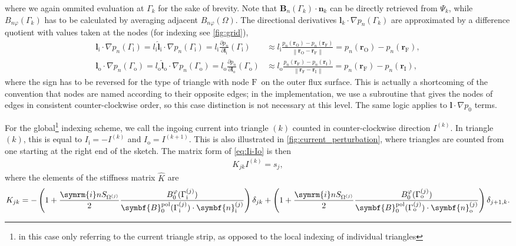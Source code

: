 \documentclass[a4paper, twoside, 10pt, english]{article}
\numberwithin{equation}{section}
\let\temp\varrho
\let\varrho\rho
\let\rho\temp
\let\temp\vartheta
\let\vartheta\theta
\let\theta\temp
\let\temp\varphi
\let\varphi\phi
\let\phi\temp
\let\vec\symbf
\newcommand*\grad{\ensuremath{\nabla}}
\newcommand*\im{\ensuremath{\symrm{i}}}  %
\newcommand*\pd[2][]{\ensuremath{\frac{\partial #1}{\partial #2}}}  %
\newcommand*\norm[1]{\ensuremath{\left \lVert #1 \right \rVert}}  %
\newcommand*\pol{\ensuremath{\textrm{pol}}}  %
\newcommand*\inw{\ensuremath{\textrm{i}}}  %
\newcommand*\out{\ensuremath{\textrm{o}}}  %
\newcommand*\vfs{\ensuremath{\textrm{F}}}  %
\newcommand*\vinw{\ensuremath{\textrm{I}}}  %
\newcommand*\vout{\ensuremath{\textrm{O}}}  %
\begin{document}
where we again ommited evaluation at $\Gamma_{k}$ for the sake of brevity. Note that $\vec{B}_{n} (\Gamma_{k}) \cdot \vec{n}_{k}$ can be directly retrieved from $\Psi_{k}$, while $B_{n \phi} (\Gamma_{k})$ has to be calculated by averaging adjacent $B_{n \phi} (\Omega)$. The directional derivatives $\vec{l}_{k} \cdot \grad p_{n} (\Gamma_{k})$ are approximated by a difference quotient with values taken at the nodes (for indexing see \cref{fig:grid}),
\begin{align}
  \vec{l}_{\inw} \cdot \grad p_{n} (\Gamma_{\inw}) = l_{\inw} \hat{\vec{l}}_{\inw} \cdot \grad p_{n} (\Gamma_{\inw}) = l_{\inw} \pd[p_{n}]{\vec{l}_{\inw}} (\Gamma_{\inw}) & \approx l_{\inw} \frac{p_{n} (\vec{r}_{\vout}) - p_{n} (\vec{r}_{\vfs})}{\norm{\vec{r}_{\vout} - \vec{r}_{\vfs}}} = p_{n} (\vec{r}_{\vout}) - p_{n} (\vec{r}_{\vfs}), \\
  \vec{l}_{\out} \cdot \grad p_{n} (\Gamma_{\out}) = l_{\out} \hat{\vec{l}}_{\out} \cdot \grad p_{n} (\Gamma_{\out}) = l_{\out} \pd[p_{n}]{\vec{l}_{\out}} (\Gamma_{\out}) & \approx l_{\out} \frac{p_{n} (\vec{r}_{\vfs}) - p_{n} (\vec{r}_{\vinw})}{\norm{\vec{r}_{\vfs} - \vec{r}_{\vinw}}} = p_{n} (\vec{r}_{\vfs}) - p_{n} (\vec{r}_{\vinw}),
\end{align}
where the sign has to be reversed for the type of triangle with node \vfs\ on the outer flux surface. This is actually a shortcoming of the convention that nodes are named according to their opposite edges; in the implementation, we use a subroutine that gives the nodes of edges in consistent counter-clockwise order, so this case distinction is not necessary at this level. The same logic applies to $\vec{l} \cdot \grad p_{0}$ terms.

For the global\footnote{in this case only referring to the current triangle strip, as opposed to the local indexing of individual triangles} indexing scheme, we call the ingoing current into triangle $(k)$ counted in counter-clockwise direction $I^{(k)}$. In triangle $(k)$, this is equal to $I_{\inw} = -I^{(k)}$ and $I_{\out} = I^{(k+1)}$. This is also illustrated in \cref{fig:current_perturbation}, where triangles are counted from one starting at the right end of the sketch. The matrix form of \cref{eq:Ii-Io} is then
\begin{gather}
  K_{jk} I^{(k)} = s_{j},
\end{gather}
where the elements of the stiffness matrix $\hat{K}$ are
\begin{gather}
  K_{jk} = -\left ( 1 + \frac{\im n S_{\Omega^{(j)}}}{2} \frac{B_{0}^{\phi} (\Gamma_{\inw}^{(j)})}{\vec{B}_{0}^{\pol} (\Gamma_{\inw}^{(j)}) \cdot \vec{n}_{\inw}^{(j)}} \right) \delta_{jk} + \left( 1 + \frac{\im n S_{\Omega^{(j)}}}{2} \frac{B_{0}^{\phi} (\Gamma_{\out}^{(j)})}{\vec{B}_{0}^{\pol} (\Gamma_{\out}^{(j)}) \cdot \vec{n}_{\out}^{(j)}} \right) \delta_{j+1, k}.
\end{gather}
\end{document}
